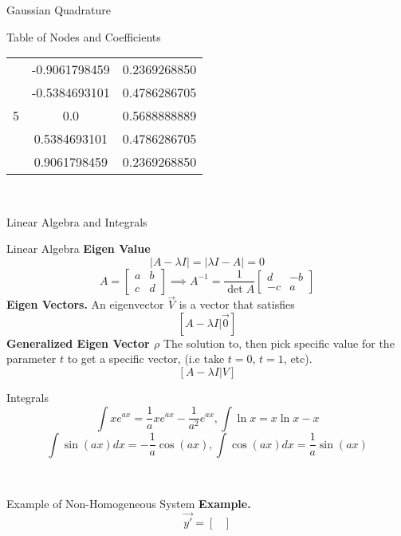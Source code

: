 \documentclass{article}
\begin{document}
\begin{multicols*}{3}
\begin{blackbox}{Gaussian Quadrature}
\begin{redbox}{Table of Nodes and Coefficients}
\begin{center}
\begin{tabular}{c|cc}
                \hline
                &-0.9061798459 &0.2369268850\\
                &-0.5384693101& 0.4786286705\\
                5 &0.0 &0.5688888889\\
                &0.5384693101 &0.4786286705\\
                &0.9061798459& 0.2369268850\\
            \end{tabular}
        \end{center}
    \end{redbox}\\[-2ex]
\end{blackbox}
\begin{blackbox}{Linear Algebra and Integrals}
    \begin{pinkbox}{Linear Algebra}      
        \textbf{Eigen Value}\\[-2ex]
        \[|A - \lambda I| = |\lambda I - A| = 0\]
        \[A = \begin{bmatrix}
            a & b\\
            c & d
        \end{bmatrix} \implies A^{-1} = \frac{1}{\det A}\begin{bmatrix}
            d & -b\\
            -c & a
        \end{bmatrix}\]
        \textbf{Eigen Vectors.} An eigenvector $\vec{V}$ is a vector that satisfies\\[-4ex]
        \[[A - \lambda I | \vec{0}]\]
        \textbf{Generalized Eigen Vector $\rho$} The solution to, then pick specific value for the parameter $t$ to get a specific vector, (i.e take $t=0$, $t=1$, etc).\\[-2ex]
        \[[A - \lambda I | V]\]
    \end{pinkbox}
    \begin{brownbox}{Integrals}
        \[\int xe^{ax} = \frac{1}{a}xe^{ax} - \frac{1}{a^2}e^{ax}, \int \ln x = x\ln x - x \]
        \[\int \sin(ax)dx = -\frac{1}{a}\cos(ax), \int \cos(ax)dx = \frac{1}{a}\sin (ax)\]
    \end{brownbox}\\[-2ex]
\end{blackbox}
\begin{blackbox}{Example of Non-Homogeneous System}
    {\footnotesize
        \textbf{Example.}\\[-2ex] 
        \[\vec{y'} = \begin{bmatrix}

\end{bmatrix}\]}
\end{blackbox}
\end{multicols*}
\end{document}
